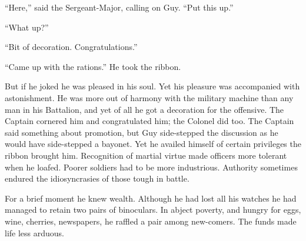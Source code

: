 ``Here,'' said the Sergeant-Major, calling on Guy. ``Put this up.''

``What up?''

``Bit of decoration. Congratulations.''

``Came up with the rations.'' He took the ribbon.

But if he joked he was pleased in his soul. Yet his pleasure was accompanied with astonishment. He was more out of harmony with the military machine than any man in his Battalion, and yet of all he got a decoration for the offensive. The Captain cornered him and congratulated him; the Colonel did too. The Captain said something about promotion, but Guy side-stepped the discussion as he would have side-stepped a bayonet. Yet he availed himself of certain privileges the ribbon brought him. Recognition of martial virtue made officers more tolerant when he loafed. Poorer soldiers had to be more industrious. Authority sometimes endured the idiosyncrasies of those tough in battle.

For a brief moment he knew wealth. Although he had lost all his watches he had managed to retain two pairs of binoculars. In abject poverty, and hungry for eggs, wine, cherries, newspapers, he raffled a pair among new-comers. The funds made life less arduous.


